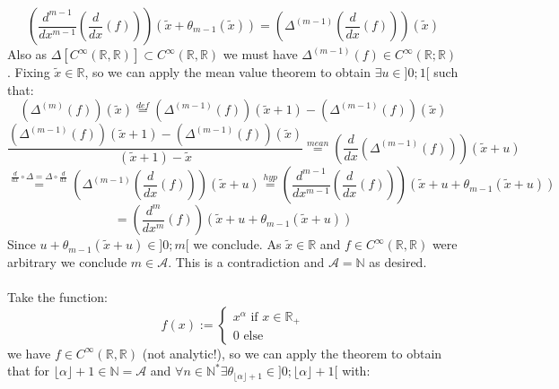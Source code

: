 \begin{solution}
    \[
        \left(\frac{d^{m-1}}{dx^{m-1}}\left(\frac{d}{dx}\left(f\right)\right)\right)\left(\tilde{x}+\theta_{m-1}\left(\tilde{x}\right)\right)=\left(\Delta^{\left(m-1\right)}\left(\frac{d}{dx}\left(f\right)\right)\right)\left(\tilde{x}\right)
    \]
    Also as \( \Delta\left[C^{\infty}\left(\mathbb{R},\mathbb{R}\right)\right]\subset C^{\infty}\left(\mathbb{R},\mathbb{R}\right) \) we must have \( \Delta^{\left(m-1\right)}\left(f\right)\in C^{\infty}\left(\mathbb{R};\mathbb{R}\right) \). Fixing \( \tilde{x}\in\mathbb{R} \), so we can apply the mean value theorem to obtain \( \exists u\in ]0;1[ \) such that:
    \[
        \left(\Delta^{\left(m\right)}\left(f\right)\right)\left(\tilde{x}\right)\overset{def}{=}\left(\Delta^{\left(m-1\right)}\left(f\right)\right)\left(\tilde{x}+1\right)-\left(\Delta^{\left(m-1\right)}\left(f\right)\right)\left(\tilde{x}\right)
    \]
    \[
        \frac{\left(\Delta^{\left(m-1\right)}\left(f\right)\right)\left(\tilde{x}+1\right)-\left(\Delta^{\left(m-1\right)}\left(f\right)\right)\left(\tilde{x}\right)}{\left(\tilde{x}+1\right)-\tilde{x}}\overset{mean}{=}\left(\frac{d}{dx}\left(\Delta^{\left(m-1\right)}\left(f\right)\right)\right)\left(\tilde{x}+u\right)
    \]
    \[
        \overset{\frac{d}{dx}\circ\Delta=\Delta\circ\frac{d}{dx}}{=}\left(\Delta^{\left(m-1\right)}\left(\frac{d}{dx}\left(f\right)\right)\right)\left(\tilde{x}+u\right)\overset{hyp}{=}\left(\frac{d^{m-1}}{dx^{m-1}}\left(\frac{d}{dx}\left(f\right)\right)\right)\left(\tilde{x}+u+\theta_{m-1}\left(\tilde{x}+u\right)\right)
    \]
    \[
        =\left(\frac{d^{m}}{dx^{m}}\left(f\right)\right)\left(\tilde{x}+u+\theta_{m-1}\left(\tilde{x}+u\right)\right)
    \]
    Since \( u+\theta_{m-1}\left(\tilde{x}+u\right)\in]0;m[ \) we conclude. As \( \tilde{x}\in\mathbb{R} \) and \( f\in C^{\infty}\left(\mathbb{R},\mathbb{R}\right) \) were arbitrary we conclude \( m\in\mathcal{A} \). This is a contradiction and \( \mathcal{A}=\mathbb{N} \) as desired.
    \\\\
    Take the function:
    \[
        f\left(x\right):=\begin{cases}
            x^{\alpha} \text{ if } x\in\mathbb{R}_{+}    \\
            0 \text{ else }
        \end{cases}
    \]
    we have \( f\in C^{\infty}\left(\mathbb{R},\mathbb{R}\right) \) (not analytic!), so we can apply the theorem to obtain that for \( \lfloor\alpha\rfloor+1\in\mathbb{N}=\mathcal{A} \) and \( \forall n\in\mathbb{N}^{*}\exists\theta_{\lfloor\alpha\rfloor+1}\in]0;\lfloor\alpha\rfloor+1[ \) with:

\end{solution}
